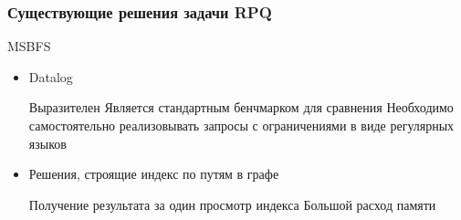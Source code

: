 \documentclass{beamer}
\begin{document}
\begin{frame}[fragile]
  \frametitle{Существующие решения задачи RPQ}
  \noindent\begin{minipage}{1\textwidth}
    \color{red}MSBFS
    \vspace{-9pt}
    \begin{itemize}
      \color{black}
      \item Datalog
            \begin{itemize}
              \pro Выразителен
              \pro Является стандартным бенчмарком для сравнения
              \con Необходимо самостоятельно реализовывать запросы с ограничениями в виде регулярных языков
            \end{itemize}
      \item Решения, строящие индекс по путям в графе
            \begin{itemize}
              \pro Получение результата за один просмотр индекса
              \con Большой расход памяти
            \end{itemize}
    \end{itemize}
  \end{minipage}
\end{frame}
\end{document}
